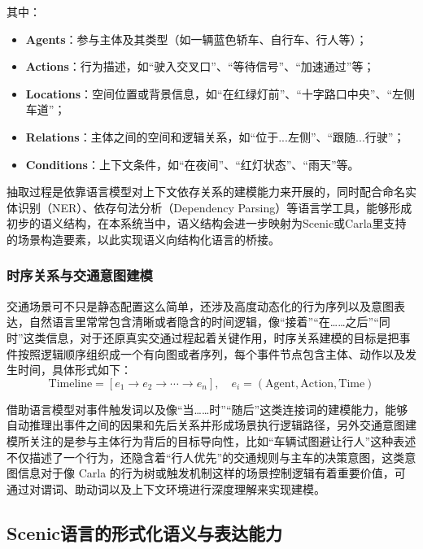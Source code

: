 其中：

\begin{itemize}
	\item \textbf{Agents}：参与主体及其类型（如一辆蓝色轿车、自行车、行人等）；
	\item \textbf{Actions}：行为描述，如“驶入交叉口”、“等待信号”、“加速通过”等；
	\item \textbf{Locations}：空间位置或背景信息，如“在红绿灯前”、“十字路口中央”、“左侧车道”；
	\item \textbf{Relations}：主体之间的空间和逻辑关系，如“位于...左侧”、“跟随...行驶”；
	\item \textbf{Conditions}：上下文条件，如“在夜间”、“红灯状态”、“雨天”等。
\end{itemize}

抽取过程是依靠语言模型对上下文依存关系的建模能力来开展的，同时配合命名实体识别（NER）、依存句法分析（Dependency Parsing）等语言学工具，能够形成初步的语义结构，在本系统当中，语义结构会进一步映射为Scenic或Carla里支持的场景构造要素，以此实现语义向结构化语言的桥接。

\subsubsection{时序关系与交通意图建模}

交通场景可不只是静态配置这么简单，还涉及高度动态化的行为序列以及意图表达，自然语言里常常包含清晰或者隐含的时间逻辑，像“接着”“在……之后”“同时”这类信息，对于还原真实交通过程起着关键作用，时序关系建模的目标是把事件按照逻辑顺序组织成一个有向图或者序列，每个事件节点包含主体、动作以及发生时间，具体形式如下：
\begin{equation}
	\text{Timeline} = \left[ e_1 \rightarrow e_2 \rightarrow \cdots \rightarrow e_n \right], \quad e_i = (\text{Agent}, \text{Action}, \text{Time})
\end{equation}

借助语言模型对事件触发词以及像“当……时”“随后”这类连接词的建模能力，能够自动推理出事件之间的因果和先后关系并形成场景执行逻辑路径，另外交通意图建模所关注的是参与主体行为背后的目标导向性，比如“车辆试图避让行人”这种表述不仅描述了一个行为，还隐含着“行人优先”的交通规则与主车的决策意图，这类意图信息对于像 Carla 的行为树或触发机制这样的场景控制逻辑有着重要价值，可通过对谓词、助动词以及上下文环境进行深度理解来实现建模。

\subsection{Scenic语言的形式化语义与表达能力}

